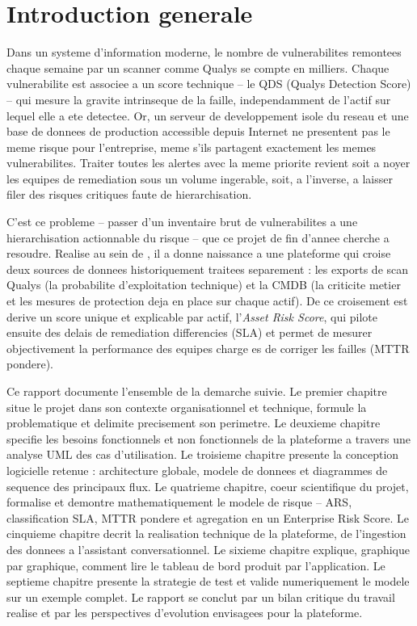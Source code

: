 \chapter*{Introduction generale}

Dans un systeme d'information moderne, le nombre de vulnerabilites remontees chaque
semaine par un scanner comme Qualys se compte en milliers. Chaque vulnerabilite est
associee a un score technique -- le QDS (Qualys Detection Score) -- qui mesure la
gravite intrinseque de la faille, independamment de l'actif sur lequel elle a ete
detectee. Or, un serveur de developpement isole du reseau et une base de donnees de
production accessible depuis Internet ne presentent pas le meme risque pour
l'entreprise, meme s'ils partagent exactement les memes vulnerabilites. Traiter
toutes les alertes avec la meme priorite revient soit a noyer les equipes de
remediation sous un volume ingerable, soit, a l'inverse, a laisser filer des risques
critiques faute de hierarchisation.

C'est ce probleme -- passer d'un inventaire brut de vulnerabilites a une
hierarchisation actionnable du risque -- que ce projet de fin d'annee cherche a
resoudre. Realise au sein de \organisme, il a donne naissance a une plateforme qui
croise deux sources de donnees historiquement traitees separement :
les exports de scan Qualys (la probabilite d'exploitation technique) et la CMDB (la
criticite metier et les mesures de protection deja en place sur chaque actif). De ce
croisement est derive un score unique et explicable par actif, l'\emph{Asset Risk
Score}, qui pilote ensuite des delais de remediation differencies (SLA) et permet de
mesurer objectivement la performance des equipes charge es de corriger les failles
(MTTR pondere).

Ce rapport documente l'ensemble de la demarche suivie. Le premier chapitre situe le
projet dans son contexte organisationnel et technique, formule la problematique et
delimite precisement son perimetre. Le deuxieme chapitre specifie les besoins
fonctionnels et non fonctionnels de la plateforme a travers une analyse UML des cas
d'utilisation. Le troisieme chapitre presente la conception logicielle retenue :
architecture globale, modele de donnees et diagrammes de sequence des principaux
flux. Le quatrieme chapitre, coeur scientifique du projet, formalise et demontre
mathematiquement le modele de risque -- ARS, classification SLA, MTTR pondere et
agregation en un Enterprise Risk Score. Le cinquieme chapitre decrit la realisation
technique de la plateforme, de l'ingestion des donnees a l'assistant conversationnel.
Le sixieme chapitre explique, graphique par graphique, comment lire le tableau de
bord produit par l'application. Le septieme chapitre presente la strategie de test et
valide numeriquement le modele sur un exemple complet. Le rapport se conclut par un
bilan critique du travail realise et par les perspectives d'evolution envisagees pour
la plateforme.

\clearpage
